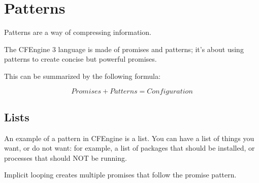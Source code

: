 



\chapter{Patterns}

Patterns are a way of compressing information.

The CFEngine 3 language is made of promises and patterns; it’s about using patterns to create concise but powerful promises.

This can be summarized by the following formula:

\[{Promises} {+} {Patterns} = {Configuration}\]









\section{Lists}

An example of a pattern in CFEngine is a list.  You can have a list of things you want, or do not want: for example, a list of packages that should be installed, or processes that should NOT be running.

Implicit looping creates multiple promises that follow the promise pattern.

